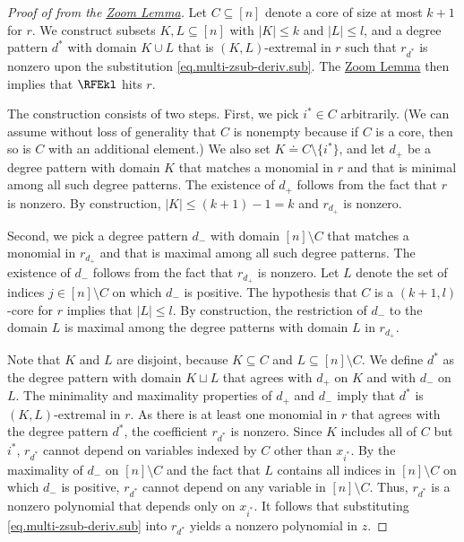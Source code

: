 \documentclass{toc}
\begin{document}
\begin{proof}[Proof of  from the
  \texorpdfstring{\hyperref[lem.multi-zsub-deriv]{Zoom Lemma}}{Zoom Lemma}]
  Let \(C \subseteq [n]\) denote a core of size at most $k+1$ for \(r\).
  We construct subsets $K, L \subseteq [n]$ with $|K| \le k$ and $|L| \le l$,
  and a degree pattern $d^*$ with domain $K \cup L$ that is $(K,L)$-extremal in
  $r$ such that $r_{d^*}$ is nonzero upon the substitution 
  \eqref{eq.multi-zsub-deriv.sub}.
  The \hyperref[lem.multi-zsub-deriv]{Zoom Lemma} then implies that $\RFEkl$ hits $r$.

  The construction consists of two steps.
  First, we pick $i^*\in C$ arbitrarily. (We can assume without loss of
  generality that $C$ is nonempty because if $C$ is a core, then so is $C$ with an additional element.) 
  We also set $K \doteq C \setminus \{i^*\}$,
  and let $d_+$ be a degree pattern with domain $K$ that matches a monomial in
  $r$ and that is minimal among all such degree patterns.
  The existence of $d_+$ follows from the fact that $r$ is nonzero.
  By construction, $|K| \le (k+1)-1 = k$ and \(r_{d_+}\) is nonzero.

  Second, we pick a degree pattern $d_-$ with domain $[n]\setminus C$ that
  matches a monomial in $r_{d_+}$ and that is maximal among all such degree
  patterns.
  The existence of $d_-$ follows from the fact that $r_{d_+}$ is nonzero.
  Let $L$ denote the set of indices $j \in [n]\setminus C$ on which $d_-$ is
  positive.
  The hypothesis that $C$ is a $(k+1,l)$-core for $r$ implies that
  $|L| \le l$.
  By construction, the restriction of $d_-$ to the domain $L$ is
  maximal among the degree patterns with domain $L$ in $r_{d_+}$.

  Note that $K$ and $L$ are disjoint,
  because $K \subseteq C$ and $L \subseteq [n]\setminus C$.
  We define $d^*$ as the degree pattern with domain $K \sqcup L$ that agrees
  with $d_+$ on $K$ and with $d_-$ on $L$.
  The minimality and maximality properties of $d_+$ and $d_-$ imply that $d^*$
  is $(K,L)$-extremal in $r$.
  As there is at least one monomial in $r$ that agrees with the degree pattern $d^*$, the coefficient $r_{d^*}$ is nonzero. Since $K$ includes all of $C$ but $i^*$, $r_{d^*}$ cannot depend on variables indexed by $C$ other than $x_{i^*}$. By the maximality of $d_-$ on $[n] \setminus C$ and the fact that $L$ contains all indices in $[n] \setminus C$ on which $d_-$ is positive, $r_{d^*}$ cannot depend on any variable in $[n] \setminus C$. Thus, $r_{d^*}$ is a nonzero polynomial that depends only on
  $x_{i^*}$. It follows that
  substituting \eqref{eq.multi-zsub-deriv.sub} into $r_{d^*}$ yields a nonzero polynomial in $z$.
\end{proof}
\end{document}
